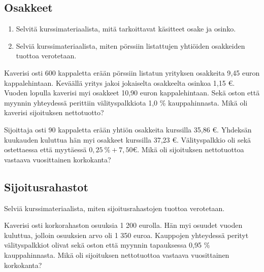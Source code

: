 \documentclass{article}\usepackage[]{graphicx}\usepackage[]{color}
\begin{document}
\subsection*{Osakkeet}

\begin{enumerate}
  \item Selvitä kurssimateriaalista, mitä tarkoittavat käsitteet osake ja osinko.
  \item Selviä kurssimateriaalista, miten pörssiin listattujen yhtiöiden osakkeiden tuottoa verotetaan.
\end{enumerate}
 
\begin{question} Kaverisi osti 600 kappaletta erään pörssiin listatun yrityksen osakkeita 9{,}45 euron kappalehintaan. Keväällä yritys jakoi jokaiselta osakkeelta osinkoa 1{,}15 \euro. Vuoden lopulla kaverisi myi osakkeet 10{,}90 euron kappalehintaan. Sekä oston että myynnin yhteydessä perittiin välityspalkkiota 1{,}0 \% kauppahinnasta. Mikä oli kaverisi sijoituksen nettotuotto?
\end{question}\begin{solution}\end{solution}

\begin{question} Sijoittaja osti 90 kappaletta erään yhtiön osakkeita kurssilla 35{,}86 \euro. Yhdeksän kuukauden kuluttua hän myi osakkeet kurssilla 37{,}23 \euro. Välityspalkkio oli sekä ostettaessa että myytäessä $0{,}25\ \%  + 7{,}50 \euro$. Mikä oli sijoituksen nettotuottoa vastaava vuosittainen korkokanta?
\end{question}

\subsection*{Sijoitusrahastot}

\begin{question} Selviä kurssimateriaalista, miten sijoitusrahastojen tuottoa verotetaan.

\end{question}

\begin{question} Kaverisi osti korkorahaston osuuksia 1 200 eurolla. Hän myi osuudet vuoden kuluttua, jolloin osuuksien arvo oli 1 350 euroa. Kauppojen yhteydessä perityt välityspalkkiot olivat sekä oston että myynnin tapauksessa 0{,}95 \% kauppahinnasta. Mikä oli sijoituksen nettotuottoa vastaava vuosittainen korkokanta?

\end{question}\begin{solution}\end{solution}
\end{document}
